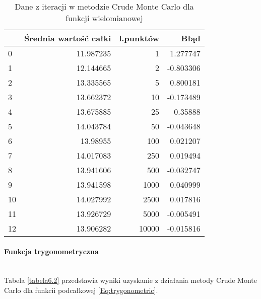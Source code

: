 \documentclass[12pt,twoside]{article}
\begin{document}
\begin{table}[H]
\centering 
\caption{Dane z iteracji w metodzie Crude Monte Carlo dla funkcji wielomianowej}
\label{tabela6.1}
\begin{tabular}{lrrr}
\toprule
{} &  Średnia wartość całki &  l.punktów &      Błąd \\
\midrule
0  &              11.987235 &       1 &  1.277747 \\
1  &              12.144665 &       2 & -0.803306 \\
2  &              13.335565 &       5 &  0.800181 \\
3  &              13.662372 &      10 & -0.173489 \\
4  &              13.675885 &      25 &  0.35888 \\
5  &              14.043784 &      50 & -0.043648 \\
6  &               13.98955 &     100 &  0.021207 \\
7  &              14.017083 &     250 &  0.019494 \\
8  &              13.941606 &     500 & -0.032747 \\
9  &              13.941598 &    1000 &  0.040999 \\
10 &              14.027992 &    2500 &  0.017816 \\
11 &              13.926729 &    5000 & -0.005491 \\
12 &              13.906282 &   10000 & -0.015816 \\
\bottomrule
\end{tabular}
\end{table}

\paragraph{Funkcja trygonometryczna}\mbox{} \\

Tabela \eqref{tabela6.2} przedstawia wyniki uzyskanie z działania metody Crude Monte Carlo dla funkcii podcałkowej \eqref{Eq:trygonometric}.
\end{document}
